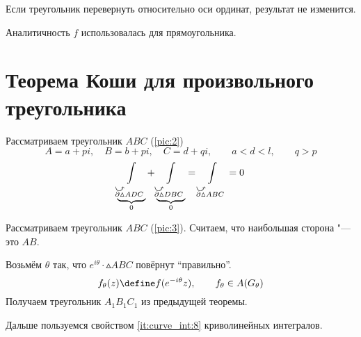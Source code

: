 Если треугольник перевернуть относительно оси ординат, результат не изменится.

\begin{remark}
	Аналитичность $ f $ использовалась для прямоугольника.
\end{remark}

\section{Теорема Коши для произвольного треугольника}

\begin{figure}[!h]
	\centering
	\caption{}
	\label{pic:2}
\end{figure}

\begin{theorem}
	Рассматриваем треугольник $ ABC $ (\autoref{pic:2})
	$$ A = a + pi, \quad B = b + pi, \quad C = d + qi, \qquad a < d < l, \qquad q > p $$
	$$ \underbrace{\int\limits_{\curvedir{\partial \vartriangle}ADC}}_0 + \underbrace{\int\limits_{\curvedir{\partial\vartriangle}DBC}}_0 = \int\limits_{\curvedir{\partial\vartriangle}ABC} = 0 $$
\end{theorem}

\begin{figure}[!ht]
	\centering
	\caption{}
	\label{pic:3}
\end{figure}

\begin{theorem}
	Рассматриваем треугольник $ ABC $ (\autoref{pic:3}). Считаем, что наибольшая сторона "--- это $ AB $.

	Возьмём $ \theta $ так, что $ e^{i\theta} \cdot \vartriangle ABC $ повёрнут ``правильно''.
	$$ f_\theta(z) \define f(e^{-i\theta}z), \qquad f_\theta \in A(G_\theta) $$
	Получаем треугольник $ A_1B_1C_1 $ из предыдущей теоремы.

	Дальше пользуемся свойством \ref{it:curve_int:8} криволинейных интегралов.
\end{theorem}


